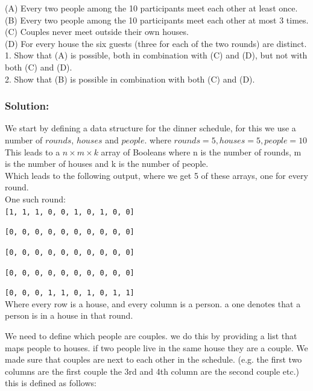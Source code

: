 \documentclass[12pt]{article}
\begin{document}
(A) Every two people among the 10 participants meet each other at least once.\\

(B) Every two people among the 10 participants meet each other at most 3 times.\\

(C) Couples never meet outside their own houses.\\

(D) For every house the six guests (three for each of the two rounds) are distinct.\\

1. Show that (A) is possible, both in combination with (C) and (D), but not with both (C) and (D).\\

2. Show that (B) is possible in combination with both (C) and (D). \\

\subsubsection*{Solution:}

We start by defining a data structure for the dinner schedule, for this we use a number of $rounds$, $houses$ and $people$. where $rounds = 5, houses=5, people=10$ \\
This leads to a $n \times m \times k$ array of Booleans where n is the number of rounds, m is the number of houses and k is the number of people. \\

Which leads to the following output, where we get 5 of these arrays, one for every round.\\
One such round:\\

{\tt [1, 1, 1, 0, 0, 1, 0, 1, 0, 0]}

{\tt [0, 0, 0, 0, 0, 0, 0, 0, 0, 0]}

{\tt [0, 0, 0, 0, 0, 0, 0, 0, 0, 0]}

{\tt [0, 0, 0, 0, 0, 0, 0, 0, 0, 0]}

{\tt [0, 0, 0, 1, 1, 0, 1, 0, 1, 1]}\\

Where every row is a house, and every column is a person. a one denotes that a person is in a house in that round.

We need to define which people are couples. we do this by providing a list that maps people to houses. if two people live in the same house they are a couple. 
We made sure that couples are next to each other in the schedule. (e.g. the first two columns are the first couple the 3rd and 4th column are the second couple etc.)  this is defined as follows: \\
\end{document}
